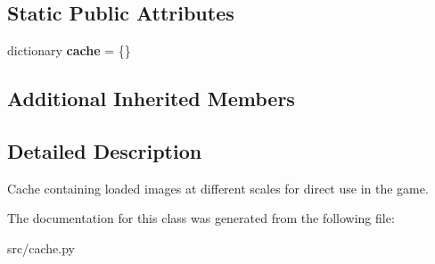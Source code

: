 \subsection*{Static Public Attributes}
\begin{DoxyCompactItemize}
\item 
\hypertarget{classsrc_1_1cache_1_1_image_cache_a6e7f4a18c626219560110f3c1d427617}{}\label{classsrc_1_1cache_1_1_image_cache_a6e7f4a18c626219560110f3c1d427617} 
dictionary {\bfseries cache} = \{\}
\end{DoxyCompactItemize}
\subsection*{Additional Inherited Members}


\subsection{Detailed Description}
\begin{DoxyVerb}Cache containing loaded images at different scales for direct use
in the game.
\end{DoxyVerb}
 

The documentation for this class was generated from the following file\+:\begin{DoxyCompactItemize}
\item 
src/cache.\+py\end{DoxyCompactItemize}
